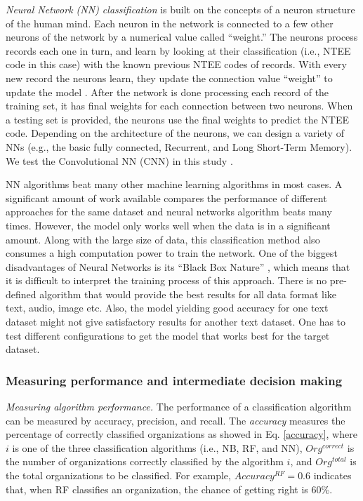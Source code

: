 \documentclass[11pt]{article}
\begin{document}
\textit{Neural Network (NN) classification} is built on the concepts of a neuron structure of the human mind. Each neuron in the network is connected to a few other neurons of the network by a numerical value called ``weight.'' The neurons process records each one in turn, and learn by looking at their classification (i.e., NTEE code in this case) with the known previous NTEE codes of records. With every new record the neurons learn, they update the connection value ``weight'' to update the model \parencites[163]{CollobertUnifiedArchitectureNatural2008}. After the network is done processing each record of the training set, it has final weights for each connection between two neurons. When a testing set is provided, the neurons use the final weights to predict the NTEE code. Depending on the architecture of the neurons, we can design a variety of NNs (e.g., the basic fully connected, Recurrent, and Long Short-Term Memory). We test the Convolutional NN (CNN) in this study \parencite{ZhangSensitivityAnalysisPractitioners2015}.

NN algorithms beat many other machine learning algorithms in most cases. A significant amount of work available compares the performance of different approaches for the same dataset and neural networks algorithm beats many times. However, the model only works well when the data is in a significant amount. Along with the large size of data, this classification method also consumes a high computation power to train the network. One of the biggest disadvantages of Neural Networks is its ``Black Box Nature'' \parencites{BenitezAreartificialneural1997}, which means that it is difficult to interpret the training process of this approach. There is no pre-defined algorithm that would provide the best results for all data format like text, audio, image etc. Also, the model yielding good accuracy for one text dataset might not give satisfactory results for another text dataset. One has to test different configurations to get the model that works best for the target dataset.

\subsubsection{Measuring performance and intermediate decision making}

\textit{Measuring algorithm performance.} The performance of a classification algorithm can be measured by {accuracy}, {precision}, and {recall}. The \textit{accuracy} measures the percentage of correctly classified organizations as showed in Eq. \ref{accuracy}, where $i$ is one of the three classification algorithms (i.e., NB, RF, and NN), $Org^{correct}$ is the number of organizations correctly classified by the algorithm $i$, and $Org^{total}$ is the total organizations to be classified. For example, $Accuracy^{RF}=0.6$ indicates that, when RF classifies an organization, the chance of getting right is 60\%.
\end{document}
